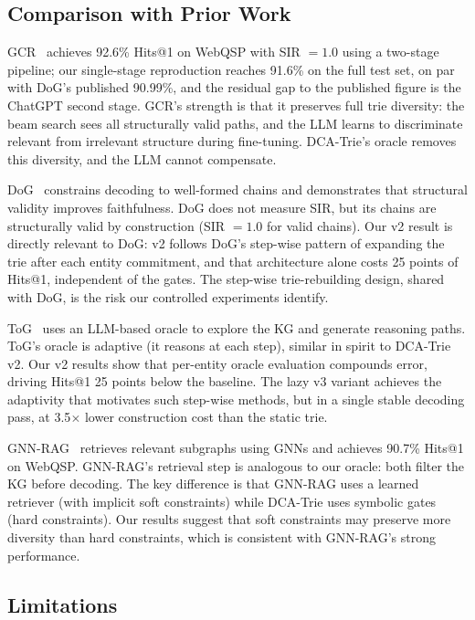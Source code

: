 \subsection{Comparison with Prior Work}
\label{sec:discussion:comparison}

GCR~\citep{luo2025-graph-constrained-reasoning} achieves 92.6\% Hits@1 on WebQSP with
SIR $= 1.0$ using a two-stage pipeline; our single-stage reproduction reaches 91.6\%
on the full test set, on par with DoG's published 90.99\%, and the residual gap to the
published figure is the ChatGPT second stage. GCR's strength is that it preserves full
trie diversity: the beam search sees all structurally valid paths, and the LLM learns to
discriminate relevant from irrelevant structure during fine-tuning. DCA-Trie's oracle
removes this diversity, and the LLM cannot compensate.

DoG~\citep{li2024-decoding-on-graphs} constrains decoding to well-formed chains and
demonstrates that structural validity improves faithfulness. DoG does not measure SIR,
but its chains are structurally valid by construction (SIR $= 1.0$ for valid chains).
Our v2 result is directly relevant to DoG: v2 follows DoG's step-wise pattern of
expanding the trie after each entity commitment, and that architecture alone costs 25
points of Hits@1, independent of the gates. The step-wise trie-rebuilding design, shared
with DoG, is the risk our controlled experiments identify.

ToG~\citep{sun2024tog} uses an LLM-based oracle to explore the KG and generate
reasoning paths. ToG's oracle is adaptive (it reasons at each step), similar in spirit
to DCA-Trie v2. Our v2 results show that per-entity oracle evaluation compounds error,
driving Hits@1 25 points below the baseline. The lazy v3 variant achieves the adaptivity
that motivates such step-wise methods, but in a single stable decoding pass, at 3.5$\times$
lower construction cost than the static trie.

GNN-RAG~\citep{mavromatis2022rearev} retrieves relevant subgraphs using GNNs and
achieves 90.7\% Hits@1 on WebQSP. GNN-RAG's retrieval step is analogous to our oracle:
both filter the KG before decoding. The key difference is that GNN-RAG uses a learned
retriever (with implicit soft constraints) while DCA-Trie uses symbolic gates (hard
constraints). Our results suggest that soft constraints may preserve more diversity than
hard constraints, which is consistent with GNN-RAG's strong performance.

\subsection{Limitations}
\label{sec:discussion:limitations}

